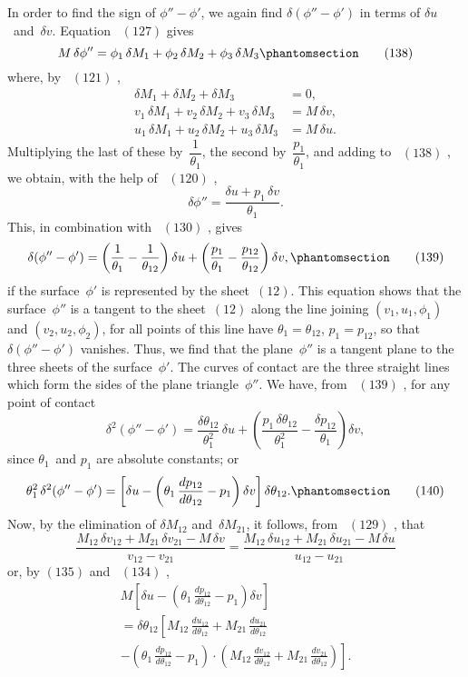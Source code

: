 \documentclass[12pt]{book}[2005/09/16]
\newcommand{\Chg}[2]{#2}
\newcommand{\Add}[1]{\Chg{}{#1}}
\newcommand{\Tag}[1]{%
  \phantomsection\label{eqn:#1}\tag*{\ensuremath{#1}}%
}
\newcommand{\Eq}[1]{%
  \hyperref[eqn:#1]{\ensuremath{#1}}%
}
\newcommand{\PageSep}[1]{\ignorespaces}
\begin{document}
In order to find the sign of $\phi'' - \phi'$, we again find
$\delta (\phi'' - \phi')$ in terms of $\delta u$~and~$\delta v$. Equation~\Eq{(127)} gives
\[
M\, \delta\phi''
  = \phi_{1}\, \delta M_{1} + \phi_{2}\, \delta M_{2} + \phi_{3}\, \delta M_{3}
\Tag{(138)}
\]
where, by~\Eq{(121)},
\begin{align*}
\delta M_{1} + \delta M_{2} + \delta M_{3} &= 0\Add{,} \\
v_{1}\, \delta M_{1} + v_{2}\, \delta M_{2} + v_{3}\, \delta M_{3} &= M\, \delta v\Add{,} \\
u_{1}\, \delta M_{1} + u_{2}\, \delta M_{2} + u_{3}\, \delta M_{3} &= M\, \delta u\Add{.}
\end{align*}
Multiplying the last of these by~$\dfrac{1}{\theta_{1}}$, the second by~$\dfrac{p_{1}}{\theta_{1}}$, and
adding to~\Eq{(138)}, we obtain, with the help of~\Eq{(120)},
\[
\delta \phi'' = \frac{\delta u + p_{1}\, \delta v}{\theta_{1}}.
\]
This, in combination with~\Eq{(130)}, gives
\[
\delta (\phi'' - \phi')
  = \left(\frac{1}{\theta_{1}} - \frac{1}{\theta_{12}}\right) \delta u
  + \left(\frac{p_{1}}{\theta_{1}} - \frac{p_{12}}{\theta_{12}}\right) \delta v,
\Tag{(139)}
\]
if the surface~$\phi'$ is represented by the sheet~$(12)$. This
equation shows that the surface~$\phi''$ is a tangent to the
sheet~$(12)$ along the line joining $(v_{1}, u_{1}, \phi_{1})$ and $(v_{2}, u_{2}, \phi_{2})$,
for all points of this line have $\theta_{1} = \theta_{12}$, $p_{1} = p_{12}$, so that
$\delta (\phi'' - \phi')$ vanishes. Thus, we find that the plane~$\phi''$ is a
tangent plane to the three sheets of the surface~$\phi'$. The
curves of contact are the three straight lines which form
\PageSep{170}
the sides of the plane triangle~$\phi''$. We have, from~\Eq{(139)},
for any point of contact
\[
\delta^{2} (\phi'' - \phi')
  = \frac{\delta \theta_{12}}{\theta_{1}^{2}}\, \delta u
  + \left(\frac{p_{1}\, \delta \theta_{12}}{\theta_{1}^{2}} - \frac{\delta p_{12}}{\theta_{1}}\right) \delta v,
\]
since $\theta_{1}$~and $p_{1}$ are absolute constants; or
\[
\theta_{1}^{2}\, \delta^{2} (\phi'' - \phi')
  = \left[\delta u - \left(\theta_{1}\, \frac{dp_{12}}{d\theta_{12}} - p_{1}\right) \delta v\right] \delta \theta_{12}.
\Tag{(140)}
\]
Now, by the elimination of $\delta M_{12}$ and~$\delta M_{21}$, it follows, from~\Eq{(129)},
that
\[
\frac{M_{12}\, \delta v_{12} + M_{21}\, \delta v_{21} - M\, \delta v}{v_{12} - v_{21}}
  = \frac{M_{12}\, \delta u_{12} + M_{21}\, \delta u_{21} - M\, \delta u}{u_{12} - u_{21}}
\]
or, by \Eq{(135)} and~\Eq{(134)},
\begin{multline*}
M \left[\delta u - \left(\theta_{1}\, \frac{dp_{12}}{d\theta_{12}} - p_{1}\right) \delta v\right] \\
  = \delta \theta_{12} \left[M_{12}\, \frac{du_{12}}{d\theta_{12}} + M_{21}\, \frac{du_{21}}{d\theta_{12}}\right. \\
  - \left.\left(\theta_{1}\, \frac{dp_{12}}{d\theta_{12}} - p_{1}\right) · \left(M_{12}\, \frac{dv_{12}}{d\theta_{12}} + M_{21}\, \frac{dv_{21}}{d\theta_{12}}\right)\right].
\end{multline*}
\end{document}
